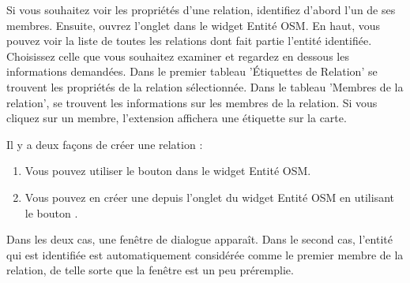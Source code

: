 Si vous souhaitez voir les propriétés d'une relation, identifiez d'abord l'un de ses membres. Ensuite, ouvrez l'onglet  dans le widget Entité OSM. En haut, vous pouvez voir la liste de toutes les relations dont fait partie l'entité identifiée. Choisissez celle que vous souhaitez examiner et regardez en dessous les informations demandées. Dans le premier tableau 'Étiquettes de Relation' se trouvent les propriétés de la relation sélectionnée. Dans le tableau 'Membres de la relation', se trouvent les informations sur les membres de la relation. Si vous cliquez sur un membre, l'extension affichera une étiquette sur la carte.


Il y a deux façons de créer une relation :
\begin{enumerate}
\item Vous pouvez utiliser le bouton  dans le widget Entité OSM.
\item  Vous pouvez en créer une depuis l'onglet  du widget Entité OSM en utilisant le bouton .
\end{enumerate}

Dans les deux cas, une fenêtre de dialogue apparaît. Dans le second cas, l'entité qui est identifiée est automatiquement considérée comme le premier membre de la relation, de telle sorte que la fenêtre est un peu préremplie.

